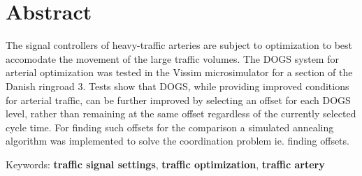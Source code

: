 \section*{Abstract}
The signal controllers of heavy-traffic arteries are subject to optimization to best accomodate the movement of the large traffic volumes.
The DOGS system for arterial optimization was tested in the Vissim microsimulator for a section of the Danish ringroad 3. Tests show that DOGS, while providing improved conditions for arterial traffic, can be further improved by selecting an offset for each DOGS level, rather than remaining at the same offset regardless of the currently selected cycle time. For finding such offsets for the comparison a simulated annealing algorithm was implemented to solve the coordination problem ie. finding offsets.

Keywords: \textbf{traffic signal settings}, \textbf{traffic optimization}, \textbf{traffic artery}